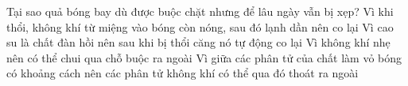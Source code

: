 \begin{ex}%
Tại sao quả bóng bay dù được buộc chặt nhưng để lâu ngày vẫn bị xẹp?	
\choice
{Vì khi thổi, không khí từ miệng vào bóng còn nóng, sau đó lạnh dần nên co lại}
{Vì cao su là chất đàn hồi nên sau khi bị thổi căng nó tự động co lại}
{Vì không khí nhẹ nên có thể chui qua chỗ buộc ra ngoài}
{\True Vì giữa các phân tử của chất làm vỏ bóng có khoảng cách nên các phân tử không khí có thể qua đó thoát ra ngoài}
\end{ex}
























